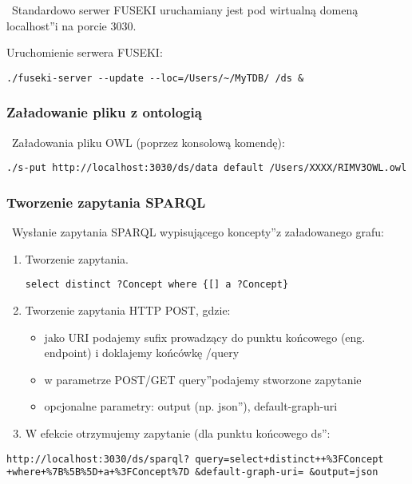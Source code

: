 ~Standardowo serwer FUSEKI uruchamiany jest pod wirtualną domeną \quotedblbase localhost\textquotedblright i na porcie 3030.

Uruchomienie serwera FUSEKI:
\begin{lstlisting}
./fuseki-server --update --loc=/Users/~/MyTDB/ /ds &
\end{lstlisting}

\subsubsection{Załadowanie pliku z ontologią}

~Załadowania pliku OWL (poprzez konsolową komendę):

\begin{lstlisting}
./s-put http://localhost:3030/ds/data default /Users/XXXX/RIMV3OWL.owl
\end{lstlisting}

\subsubsection{Tworzenie zapytania SPARQL}

~Wysłanie zapytania SPARQL wypisującego \quotedblbase koncepty\textquotedblright z załadowanego grafu:

\begin{enumerate}
\item Tworzenie zapytania.
\begin{lstlisting}
select distinct ?Concept where {[] a ?Concept}
\end{lstlisting}
\item Tworzenie zapytania HTTP POST, gdzie:
\begin{itemize}
\item jako URI podajemy sufix prowadzący do punktu końcowego (eng. endpoint) i doklajemy końcówkę /query
\item w parametrze POST/GET \quotedblbase query\textquotedblright podajemy stworzone zapytanie 
\item opcjonalne parametry: output (np. \quotedblbase json\textquotedblright ), default-graph-uri
\end{itemize}
\item W efekcie otrzymujemy zapytanie (dla punktu końcowego \quotedblbase ds\textquotedblright :
\end{enumerate}

\begin{lstlisting}
http://localhost:3030/ds/sparql? query=select+distinct++%3FConcept +where+%7B%5B%5D+a+%3FConcept%7D &default-graph-uri= &output=json
\end{lstlisting}